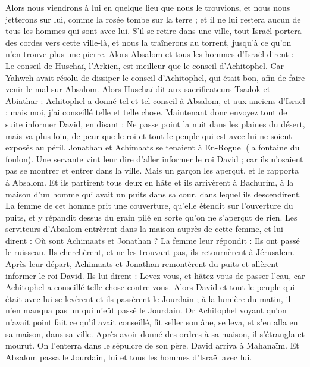 \begin{multicols}{2}
Alors nous viendrons à lui en quelque lieu que nous le trouvions, et nous nous jetterons sur lui, comme la rosée tombe sur la terre ; et il ne lui restera aucun de tous les hommes qui sont avec lui.
S'il se retire dans une ville, tout Israël portera des cordes vers cette ville-là, et nous la traînerons au torrent, jusqu'à ce qu'on n'en trouve plus une pierre.
Alors Absalom et tous les hommes d'Israël dirent : Le conseil de Huschaï, l'Arkien, est meilleur que le conseil d’Achitophel. Car Yahweh avait résolu de dissiper le conseil d’Achitophel, qui était bon, afin de faire venir le mal sur Absalom.
Alors Huschaï dit aux sacrificateurs Tsadok et Abiathar : Achitophel a donné tel et tel conseil à Absalom, et aux anciens d'Israël ; mais moi, j'ai conseillé telle et telle chose.
Maintenant donc envoyez tout de suite informer David, en disant : Ne passe point la nuit dans les plaines du désert, mais va plus loin, de peur que le roi et tout le peuple qui est avec lui ne soient exposés au péril.
Jonathan et Achimaats se tenaient à En-Roguel (la fontaine du foulon). Une servante vint leur dire d'aller informer le roi David ; car ils n'osaient pas se montrer et entrer dans la ville.
Mais un garçon les aperçut, et le rapporta à Absalom. Et ils partirent tous deux en hâte et ils arrivèrent à Bachurim, à la maison d'un homme qui avait un puits dans sa cour, dans lequel ils descendirent.
La femme de cet homme prit une couverture, qu’elle étendit sur l'ouverture du puits, et y répandit dessus du grain pilé en sorte qu'on ne s’aperçut de rien.
Les serviteurs d'Absalom entrèrent dans la maison auprès de cette femme, et lui dirent : Où sont Achimaats et Jonathan ? La femme leur répondit : Ils ont passé le ruisseau. Ils cherchèrent, et ne les trouvant pas, ils retournèrent à Jérusalem.
Après leur départ, Achimaats et Jonathan remontèrent du puits et allèrent informer le roi David. Ils lui dirent : Levez-vous, et hâtez-vous de passer l'eau, car Achitophel a conseillé telle chose contre vous.
Alors David et tout le peuple qui était avec lui se levèrent et ils passèrent le Jourdain ; à la lumière du matin, il n'en manqua pas un qui n'eût passé le Jourdain.
Or Achitophel voyant qu'on n'avait point fait ce qu'il avait conseillé, fit seller son âne, se leva, et s'en alla en sa maison, dans sa ville. Après avoir donné des ordres à sa maison, il s'étrangla et mourut. On l'enterra dans le sépulcre de son père.
David arriva à Mahanaïm. Et Absalom passa le Jourdain, lui et tous les hommes d'Israël avec lui.

\end{multicols}
